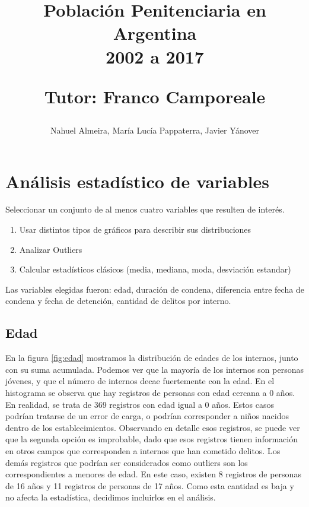 \documentclass[10pt]{article}
\begin{document}
	
\title{Población Penitenciaria en Argentina\\ 2002 a 2017 \\
	\begin{small}
		Tutor: Franco Camporeale
	\end{small}}
\author{\small{Nahuel Almeira, María Lucía Pappaterra, Javier Y\'anover}}

\maketitle

\section{Análisis estadístico de variables}

Seleccionar un conjunto de al menos cuatro variables que resulten de interés.

\begin{enumerate}
	\item Usar distintos tipos de gráficos para describir sus distribuciones
	\item Analizar Outliers
	\item Calcular estadísticos clásicos (media, mediana, moda, desviación estandar)
\end{enumerate}

Las variables elegidas fueron: edad, duración de condena, diferencia entre fecha de condena y fecha de detención, cantidad de delitos por interno.

\subsection{Edad}

En la figura \ref{fig:edad} mostramos la distribuci\'on de edades de los internos, junto con su suma acumulada. Podemos ver que la mayor\'ia de los internos son personas j\'ovenes, y que el n\'umero de internos decae fuertemente con la edad. En el histograma se observa que hay registros de personas con edad cercana a 0 años. En realidad, se trata de 369 registros con edad igual a 0 años. Estos casos podr\'ian tratarse de un error de carga, o podr\'ian corresponder a ni\~nos nacidos dentro de los establecimientos. Observando en detalle esos registros, se puede ver que la segunda opci\'on es improbable, dado que esos registros tienen informaci\'on en otros campos que corresponden a internos que han cometido delitos.  Los dem\'as registros que podr\'ian ser considerados como outliers son los correspondientes a menores de edad. En este caso, existen 8 registros de personas de 16 a\~nos y 11 registros de personas de 17 a\~nos. Como esta cantidad es baja y no afecta la estad\'istica, decidimos incluirlos en el an\'alisis.
\end{document}
